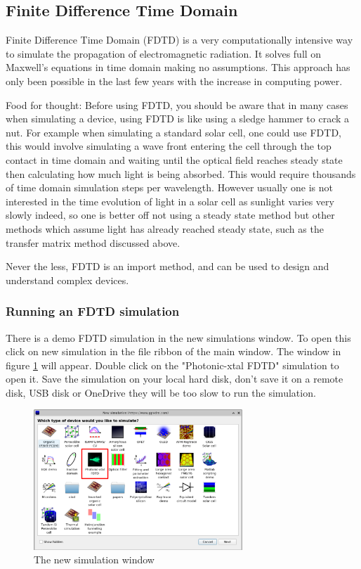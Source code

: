 \subsection{Finite Difference Time Domain}
Finite Difference Time Domain (FDTD) is a very computationally intensive way to simulate the propagation of electromagnetic radiation.  It solves full on Maxwell's equations in time domain making no assumptions.  This approach has only been possible in the last few years with the increase in computing power.

Food for thought: Before using FDTD, you should be aware that in many cases when simulating a device, using FDTD is like using a sledge hammer to crack a nut.  For example when simulating a standard solar cell, one could use FDTD, this would involve simulating a wave front entering the cell through the top contact in time domain and waiting until the optical field reaches steady state then calculating how much light is being absorbed. This would require thousands of time domain simulation steps per wavelength.  However usually one is not interested in the time evolution of light in a solar cell as sunlight varies very slowly indeed, so one is better off not using a steady state method but other methods which assume light has already reached steady state, such as the transfer matrix method discussed above.

Never the less, FDTD is an import method, and can be used to design and understand complex devices.

\subsubsection{Running an FDTD simulation}
There is a demo FDTD simulation in the new simulations window. To open this click on new simulation in the file ribbon of the main window. The window in figure \ref{fig:fdtdnewdemo} will appear. Double click on the "Photonic-xtal FDTD" simulation to open it.  Save the simulation on your local hard disk, don't save it on a remote disk, USB disk or OneDrive they will be too slow to run the simulation.

\begin{figure}[H]
\centering
\includegraphics[width=0.7\textwidth]{./images/fdtd_1.png}
\caption{The new simulation window}
\label{fig:fdtdnewdemo}
\end{figure}

